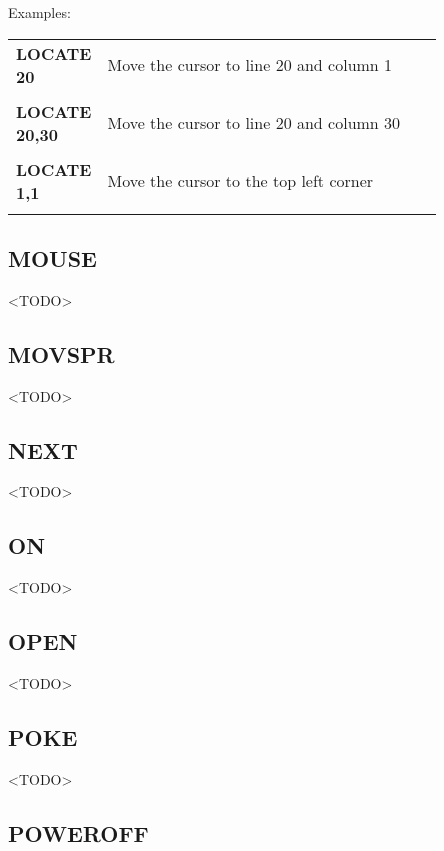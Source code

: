 Examples:

\begin{tabular}{l p{0.85\linewidth}}

	{\ttfamily\bfseries LOCATE 20} & Move the cursor to line 20 and column
	1\\\\

	{\ttfamily\bfseries LOCATE 20,30} & Move the cursor to line 20 and column
	30\\\\

	{\ttfamily\bfseries LOCATE 1,1} & Move the cursor to the top left corner\\\\

\end{tabular}

\vspace{16pt}

\subsection{MOUSE}

<TODO>

\subsection{MOVSPR}

<TODO>

\subsection{NEXT}

<TODO>

\subsection{ON}

<TODO>

\subsection{OPEN}

<TODO>

\subsection{POKE}

<TODO>

\subsection{POWEROFF}

